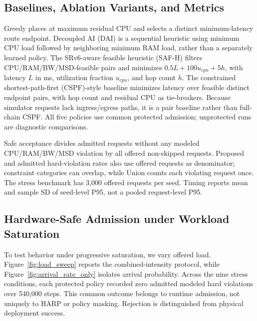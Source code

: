 \documentclass[final,5p]{elsarticle}
\newcommand{\rev}[1]{\textcolor{revisiongreen}{#1}}
\let\newrev\rev
\begin{document}
\subsection{Baselines, Ablation Variants, and Metrics}
\label{subsec:baselines_metrics}
\newrev{Greedy places at maximum residual CPU and selects a distinct minimum-latency route endpoint. Decoupled AI (DAI) is a sequential heuristic using minimum CPU load followed by neighboring minimum RAM load, rather than a separately learned policy. The SRv6-aware feasible heuristic (SAF-H) filters CPU/RAM/BW/MSD-feasible pairs and minimizes \(0.5L+100u_{cpu}+5h\), with latency \(L\) in ms, utilization fraction \(u_{cpu}\), and hop count \(h\). The constrained shortest-path-first (CSPF)-style baseline minimizes latency over feasible distinct endpoint pairs, with hop count and residual CPU as tie-breakers. Because simulator requests lack ingress/egress paths, it is a pair baseline rather than full-chain CSPF. All five policies use common protected admission; unprotected runs are diagnostic comparisons.}

\newrev{Safe acceptance divides admitted requests without any modeled CPU/RAM/BW/MSD violation by all offered non-skipped requests. Proposed and admitted hard-violation rates also use offered requests as denominator; constraint categories can overlap, while Union counts each violating request once. The stress benchmark has 3,000 offered requests per seed. Timing reports mean and sample SD of seed-level P95, not a pooled request-level P95.}



\subsection{Hardware-Safe Admission under Workload Saturation}
\label{subsec:admission_under_saturation}
To test behavior under progressive saturation, we vary offered load. \newrev{Figure~\ref{fig:load_sweep} reports the combined-intensity protocol, while Figure~\ref{fig:arrival_rate_only} isolates arrival probability. Across the nine stress conditions, each protected policy recorded zero admitted modeled hard violations over 540,000 steps. This common outcome belongs to runtime admission, not uniquely to HARP or policy masking. Rejection is distinguished from physical deployment success.}
\end{document}
